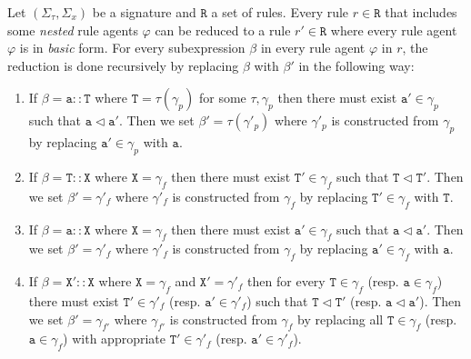 \documentclass{entcs}
\renewcommand{\~}[0]{\texttildelow}
\begin{document}
\begin{definition}
Let $(\Sigma_\tau,\Sigma_x)$ be a signature and $\mathtt{R}$ a set of rules. Every rule $r\in\mathtt{R}$ that includes some \emph{nested} rule agents $\varphi$ can be reduced to a rule $r'\in\mathtt{R}$ where every rule agent $\varphi$ is in \emph{basic} form. For every subexpression $\beta$ in every rule agent $\varphi$ in $r$, the reduction is done recursively by replacing $\beta$ with $\beta'$ in the following way:
\begin{enumerate}
\item If $\beta=\mathtt{a}::\mathtt{T}$ where $\mathtt{T}=\tau(\gamma_p)$ for some $\tau,\gamma_p$ then there must exist $\mathtt{a}'\in\gamma_p$ such that $\mathtt{a}\lhd\mathtt{a}'$. Then we set $\beta'={\tau}(\gamma'_p)$ where $\gamma'_p$ is constructed from $\gamma_p$ by replacing $\mathtt{a}'\in\gamma_p$ with $\mathtt{a}$.
\item If $\beta=\mathtt{T}::\mathtt{X}$ where $\mathtt{X}=\gamma_f$ then there must exist $\mathtt{T}'\in\gamma_f$ such that $\mathtt{T}\lhd\mathtt{T}'$. Then we set $\beta'=\gamma'_f$ where $\gamma'_f$ is constructed from $\gamma_f$ by replacing $\mathtt{T}'\in\gamma_f$ with $\mathtt{T}$. 
\item If $\beta=\mathtt{a}::\mathtt{X}$ where $\mathtt{X}=\gamma_f$ then there must exist $\mathtt{a}'\in\gamma_f$ such that $\mathtt{a}\lhd\mathtt{a}'$. Then we set $\beta'=\gamma'_f$ where $\gamma'_f$ is constructed from $\gamma_f$ by replacing $\mathtt{a}'\in\gamma_f$ with $\mathtt{a}$. 
\item If $\beta=\mathtt{X}'::\mathtt{X}$ where $\mathtt{X}=\gamma_f$ and $\mathtt{X}'= \gamma'_f$ then for every $\mathtt{T} \in \gamma_f$ (resp. $\mathtt{a} \in \gamma_f$) there must exist $\mathtt{T}' \in \gamma'_f$ (resp. $\mathtt{a}' \in \gamma'_f$) such that $\mathtt{T} \lhd \mathtt{T}'$ (resp. $\mathtt{a} \lhd \mathtt{a}'$). Then we set $\beta'=\gamma_{f'}$ where $\gamma_{f'}$ is constructed from $\gamma_f$ by replacing all $\mathtt{T} \in \gamma_f$ (resp. $\mathtt{a} \in \gamma_f$) with appropriate $\mathtt{T}' \in \gamma'_f$  (resp. $\mathtt{a}' \in \gamma'_f$).
\end{enumerate} 
\end{definition}
\end{document}
